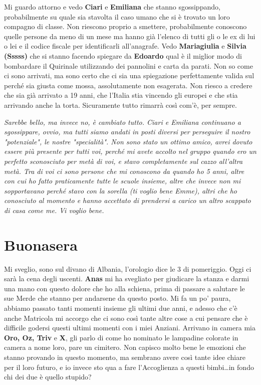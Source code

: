 Mi guardo attorno e vedo \textbf{Ciari} e \textbf{Emiliana} che stanno sgossippando, probabilmente su quale sia stavolta il caso umano che si è trovato un loro compagno di classe. Non riescono proprio a smettere, probabilmente conoscono quelle persone da meno di un mese ma hanno già l'elenco di tutti gli o le ex di lui o lei e il codice fiscale per identificarli all'anagrafe. Vedo \textbf{Mariagiulia} e \textbf{Silvia (Sssss)} che si stanno facendo spiegare da \textbf{Edoardo} qual è il miglior modo di bombardare il Quirinale utilizzando dei pannolini e carta da parati. Non so come ci sono arrivati, ma sono certo che ci sia una spiegazione perfettamente valida sul perché sia giusta come mossa, assolutamente non esagerata. Non riesco a credere che sia già arrivato a 19 anni, che l'Italia stia vincendo gli europei e che stia arrivando anche la torta. Sicuramente tutto rimarrà così com'è, per sempre.
\vspace{5mm}

\textit{Sarebbe bello, ma invece no, è cambiato tutto. Ciari e Emiliana continuano a sgossippare, ovvio, ma tutti siamo andati in posti diversi per perseguire il nostro "potenziale", le nostre "specialità". Non sono stato un ottimo amico, avrei dovuto essere più presente per tutti voi, perché mi avete accolto nel gruppo quando ero un perfetto sconosciuto per metà di voi, e stavo completamente sul cazzo all'altra metà. Tra di voi ci sono persone che mi conoscono da quando ho 5 anni, altre con cui ho fatto praticamente tutte le scuole insieme, altre che invece non mi sopportavano perché stavo con la sorella (ti voglio bene Emme), altri che ho conosciuto al momento e hanno accettato di prendersi a carico un altro scappato di casa come me. Vi voglio bene.}  

\section{Buonasera}
Mi sveglio, sono sul divano di Albania, l'orologio dice le 3 di pomeriggio. Oggi ci sarà la cena degli uscenti. \textbf{Anas} mi ha svegliato per giudicare la stanza e darmi una mano con questo dolore che ho alla schiena, prima di passare a salutare le sue Merde che stanno per andarsene da questo posto. Mi fa un po' paura, abbiamo passato tanti momenti insieme gli ultimi due anni, e adesso che c'è anche Matricola mi accorgo che ci sono così tante altre cose a cui pensare che è difficile godersi questi ultimi momenti con i miei Anziani. Arrivano in camera mia \textbf{Oro, Oz, Triv} e \textbf{X}, gli parlo di come ho nominato le lampadine colorate in camera a nome loro, pare un cimitero. Non capisco molto bene le emozioni che stanno provando in questo momento, ma sembrano avere così tante idee chiare per il loro futuro, e io invece sto qua a fare l'Accoglienza a questi bimbi\dots in fondo chi dei due è quello stupido?
\vspace{5mm}

